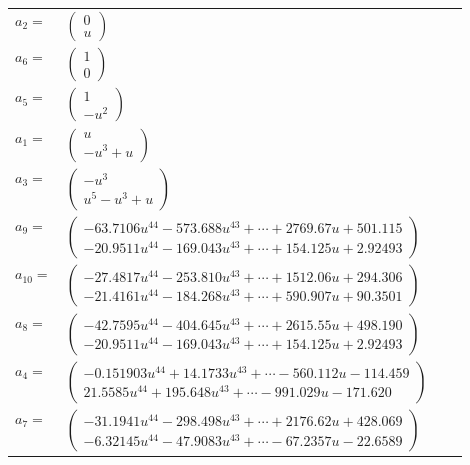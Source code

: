 \documentclass[1p]{elsarticle_modified}
\theoremstyle{definition}
\begin{document}
\begin{tabular}{m{7pt} m{180pt} m{7pt} m{180pt} }
\flushright $a_{2}=$&$\begin{pmatrix}0\\u\end{pmatrix}$ \\
\flushright $a_{6}=$&$\begin{pmatrix}1\\0\end{pmatrix}$ \\
\flushright $a_{5}=$&$\begin{pmatrix}1\\- u^2\end{pmatrix}$ \\
\flushright $a_{1}=$&$\begin{pmatrix}u\\- u^3+u\end{pmatrix}$ \\
\flushright $a_{3}=$&$\begin{pmatrix}- u^3\\u^5- u^3+u\end{pmatrix}$ \\
\flushright $a_{9}=$&$\begin{pmatrix}-63.7106 u^{44}-573.688 u^{43}+\cdots+2769.67 u+501.115\\-20.9511 u^{44}-169.043 u^{43}+\cdots+154.125 u+2.92493\end{pmatrix}$ \\
\flushright $a_{10}=$&$\begin{pmatrix}-27.4817 u^{44}-253.810 u^{43}+\cdots+1512.06 u+294.306\\-21.4161 u^{44}-184.268 u^{43}+\cdots+590.907 u+90.3501\end{pmatrix}$ \\
\flushright $a_{8}=$&$\begin{pmatrix}-42.7595 u^{44}-404.645 u^{43}+\cdots+2615.55 u+498.190\\-20.9511 u^{44}-169.043 u^{43}+\cdots+154.125 u+2.92493\end{pmatrix}$ \\
\flushright $a_{4}=$&$\begin{pmatrix}-0.151903 u^{44}+14.1733 u^{43}+\cdots-560.112 u-114.459\\21.5585 u^{44}+195.648 u^{43}+\cdots-991.029 u-171.620\end{pmatrix}$ \\
\flushright $a_{7}=$&$\begin{pmatrix}-31.1941 u^{44}-298.498 u^{43}+\cdots+2176.62 u+428.069\\-6.32145 u^{44}-47.9083 u^{43}+\cdots-67.2357 u-22.6589\end{pmatrix}$ \\

\end{tabular}
\end{document}
